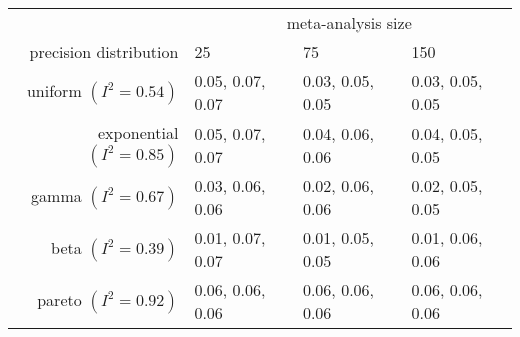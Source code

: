 \begin{tabular}{rlll}
  \hline
  & \multicolumn{3}{c}{meta-analysis size} \\
 precision distribution &25&75&150\\
 \hline
uniform $(I^2=0.54)$ & 0.05, 0.07, 0.07 & 0.03, 0.05, 0.05 & 0.03, 0.05, 0.05 \\ 
  exponential $(I^2=0.85)$ & 0.05, 0.07, 0.07 & 0.04, 0.06, 0.06 & 0.04, 0.05, 0.05 \\ 
  gamma $(I^2=0.67)$ & 0.03, 0.06, 0.06 & 0.02, 0.06, 0.06 & 0.02, 0.05, 0.05 \\ 
  beta $(I^2=0.39)$ & 0.01, 0.07, 0.07 & 0.01, 0.05, 0.05 & 0.01, 0.06, 0.06 \\ 
  pareto $(I^2=0.92)$ & 0.06, 0.06, 0.06 & 0.06, 0.06, 0.06 & 0.06, 0.06, 0.06 \\ 
   \hline
\end{tabular}
